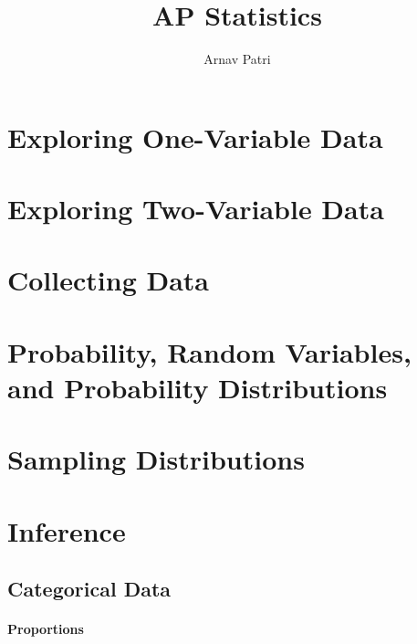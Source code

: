 \documentclass[12pt, A4]{report}
\title{AP Statistics}
\author{Arnav Patri}
\begin{document}
	\maketitle
	\tableofcontents
	\chapter{Exploring One-Variable Data}
		
	\chapter{Exploring Two-Variable Data}
		
	\chapter{Collecting Data}
		
	\chapter{Probability, Random Variables, and Probability Distributions}
		
	\chapter{Sampling Distributions}
		
	\chapter{Inference}
		\section{Categorical Data}
			\subsubsection{Proportions}
				
\end{document}
